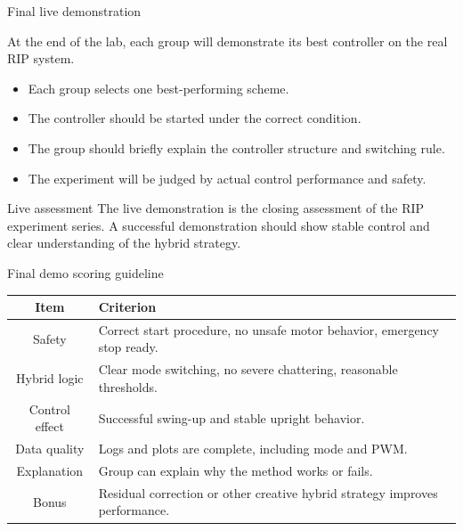 \documentclass[aspectratio=169]{beamer}
\begin{document}
\begin{frame}{Final live demonstration}

At the end of the lab, each group will demonstrate its best controller on the real RIP system.

\vspace{0.2cm}

\begin{itemize}
    \item Each group selects one best-performing scheme.
    \vspace{0.18cm}
    \item The controller should be started under the correct condition.
    \vspace{0.18cm}
    \item The group should briefly explain the controller structure and switching rule.
    \vspace{0.18cm}
    \item The experiment will be judged by actual control performance and safety.
\end{itemize}

\vspace{0.2cm}

\begin{block}{Live assessment}
\small
The live demonstration is the closing assessment of the RIP experiment series.
A successful demonstration should show stable control and clear understanding of the hybrid strategy.
\end{block}

\end{frame}

\begin{frame}{Final demo scoring guideline}

\begin{center}
\begin{tabular}{c|p{}}
\hline
\textbf{Item} & \textbf{Criterion} \\
\hline
Safety & Correct start procedure, no unsafe motor behavior, emergency stop ready. \\
\hline
Hybrid logic & Clear mode switching, no severe chattering, reasonable thresholds. \\
\hline
Control effect & Successful swing-up and stable upright behavior. \\
\hline
Data quality & Logs and plots are complete, including mode and PWM. \\
\hline
Explanation & Group can explain why the method works or fails. \\
\hline
Bonus & Residual correction or other creative hybrid strategy improves performance. \\
\hline
\end{tabular}
\end{center}

\end{frame}
\end{document}
